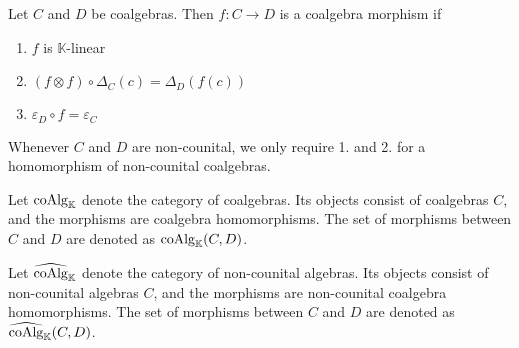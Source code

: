 \documentclass[../thesis.tex]{subfiles}
\begin{document}




                    


            \begin{definition}
                Let $C$ and $D$ be coalgebras. Then $f:C\rightarrow D$ is a coalgebra morphism if
                \begin{enumerate}
                    \item $f$ is $\mathbb{K}$-linear
                    \item $(f\otimes f)\circ\Delta_C(c) = \Delta_D(f(c))$
                    \item $\varepsilon_D \circ f = \varepsilon_C$
                \end{enumerate}
                Whenever $C$ and $D$ are non-counital, we only require 1. and 2. for a homomorphism of non-counital coalgebras.
            \end{definition}

            \begin{definition}
                Let $\tt{coAlg}_{\mathbb{K}}$ denote the category of coalgebras. Its objects consist of coalgebras $C$, and the morphisms are coalgebra homomorphisms. The set of morphisms between $C$ and $D$ are denoted as $\tt{coAlg}_{\mathbb{K}}(C,D)$.
                
                Let $\widehat{\tt{coAlg}}_{\mathbb{K}}$ denote the category of non-counital algebras. Its objects consist of non-counital algebras $C$, and the morphisms are non-counital coalgebra homomorphisms. The set of morphisms between $C$ and $D$ are denoted as $\widehat{\tt{coAlg}}_{\mathbb{K}}(C,D)$.
            \end{definition}
\end{document}
